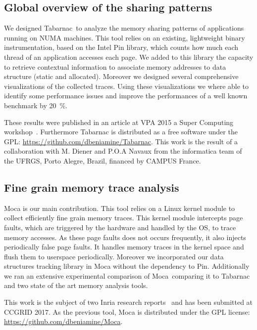 \subsection{Global overview of the sharing patterns}

We designed \gls{Tabarnac} to analyze the memory sharing patterns of applications running on \gls{NUMA} machines.
This tool relies on an existing, lightweight binary instrumentation, based on the \gls{Intel} \gls{Pin} library, which counts how much each thread of an application accesses each page.
We added to this library the capacity to retrieve contextual information to associate memory addresses to data structure (static and allocated).
Moreover we designed several comprehensive visualizations of the collected traces.
Using these visualizations we where able to identify some performance issues and improve the performances of a well known benchmark by \SI{20}{\%}.

These results were published in an article at \gls{VPA} 2015 a Super Computing workshop~\cite{Beniamine15TABARNAC}.
Furthermore \gls{Tabarnac} is distributed as a free software under the \gls{GPL}: \url{https://github.com/dbeniamine/Tabarnac}.
This work is the result of a collaboration with M. Diener and P.O.A Navaux from the informatica team of the \gls{UFRGS}, Porto Alegre, Brazil, financed by CAMPUS France.

\subsection{Fine grain memory trace analysis}

\gls{Moca} is our main contribution.
This tool relies on a \gls{Linux} kernel module to collect efficiently fine grain memory traces.
This kernel module intercepts page faults, which are triggered by the hardware and handled by the \gls{OS}, to trace memory accesses.
As these page faults does not occurs frequently, it also injects periodically false page faults.
It handles memory traces in the kernel space and flush them to userspace periodically.
Moreover we incorporated our data structures tracking library in \gls{Moca} without the dependency to \gls{Pin}.
Additionally we ran an extensive experimental comparison of \gls{Moca} comparing it to \gls{Tabarnac} and two state of the art memory analysis tools.

This work is the subject of two Inria research reports~\cite{Beniamine15Memory,Beniamine16Moca} and has been submitted at \gls{CCGRID} 2017.
As the previous tool, \gls{Moca} is distributed under the \gls{GPL} license:\\
\url{https://github.com/dbeniamine/Moca}.

